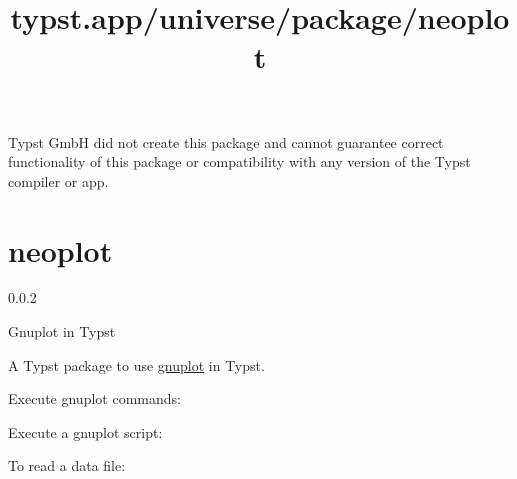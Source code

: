 Typst GmbH did not create this package and cannot guarantee correct
functionality of this package or compatibility with any version of the
Typst compiler or app.


\title{typst.app/universe/package/neoplot}

\label{banner}
\section{neoplot}\label{neoplot}

{ 0.0.2 }

Gnuplot in Typst

\label{readme}
A Typst package to use \href{http://www.gnuplot.info/}{gnuplot} in
Typst.

\begin{Shaded}
\begin{Highlighting}[]
\end{Highlighting}
\end{Shaded}

Execute gnuplot commands:

\begin{Shaded}
\begin{Highlighting}[]
\NormalTok{    \textasciigrave{}\textasciigrave{}\textasciigrave{}}
\NormalTok{)}
\end{Highlighting}
\end{Shaded}

Execute a gnuplot script:

\begin{Shaded}
\begin{Highlighting}[]
\NormalTok{    \textasciigrave{}\textasciigrave{}\textasciigrave{}}
\NormalTok{)}
\end{Highlighting}
\end{Shaded}

To read a data file:

